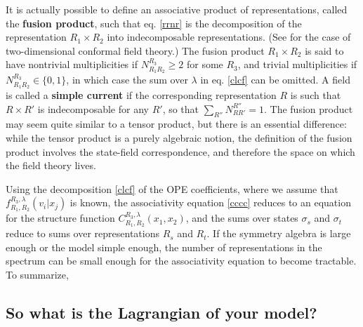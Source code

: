 \documentclass[12pt, a4paper, notitlepage, twoside]{report}
\numberwithin{equation}{section}
\theoremstyle{break}
\begin{document}
It is actually possible to define an associative product of representations, called the \textbf{\boldmath fusion product}, such that eq. \eqref{rrnr} is the decomposition of the representation $R_1\times R_2$ into indecomposable representations. (See \cite{gab99} for the case of two-dimensional conformal field theory.) 
The fusion product $R_1\times R_2$ is said to have nontrivial multiplicities if $N_{R_1R_2}^{R_3}\geq 2$ for some $R_3$, and trivial multiplicities if $N_{R_1R_2}^{R_3}\in \{0,1\}$, in which case the sum over $\lambda$ in eq. \eqref{clcf} can be omitted.
A field is called a \textbf{\boldmath simple current} if the corresponding representation $R$ is such that $R\times R'$ is indecomposable for any $R'$, so that $\sum_{R''} N_{RR'}^{R''} =1$. 
The fusion product may seem quite similar to a tensor product, but there is an essential difference: while the tensor product is a purely algebraic notion, the definition of the fusion product involves the state-field correspondence, and therefore the space on which the field theory lives. 

Using the decomposition \eqref{clcf} of the OPE coefficients, where we assume that $f_{R_1,R_2}^{R_3,\lambda}(v_i|x_j)$ is known, the 
associativity equation \eqref{cccc} reduces to an equation for the structure function $C_{R_1,R_2}^{R_3,\lambda}(x_1,x_2)$, and the sums over states $\sigma_s$ and $\sigma_t$ reduce to sums over representations $R_s$ and $R_t$.
If the symmetry algebra is large enough or the model simple enough, the number of representations in the spectrum can be small enough for the associativity equation to become tractable.
To summarize,
\begin{center}
\end{center}


\subsection{So what is the Lagrangian of your model? \label{seclagr}}
\end{document}

